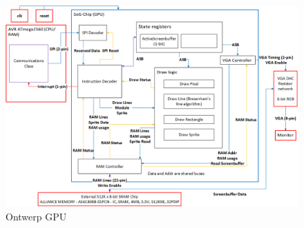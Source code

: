 \documentclass{scrartcl} %
\begin{document}
\begin{figure}[H]
\centering
	\includegraphics[scale=0.9, angle=90]{resource/systeemdrawing-detail.png}
	\caption{Ontwerp GPU}
	\label{fig:ontwerp-schema}
\end{figure}



\end{document}
